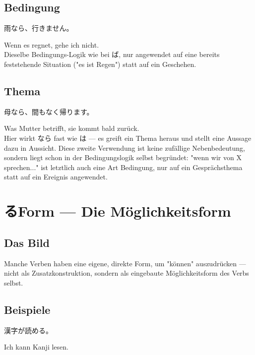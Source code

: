 \documentclass[12pt]{book}
\begin{document}
\section*{Bedingung}

\par\quad 雨なら、行きません。\\
\par\quad Wenn es regnet, gehe ich nicht.\\

Dieselbe Bedingungs-Logik wie bei ば, nur angewendet auf eine bereits feststehende Situation ("es ist Regen") statt auf ein Geschehen.

\section*{Thema}

\par\quad 母なら、間もなく帰ります。\\
\par\quad Was Mutter betrifft, sie kommt bald zurück.\\

Hier wirkt なら fast wie は — es greift ein Thema heraus und stellt eine Aussage dazu in Aussicht. Diese zweite Verwendung ist keine zufällige Nebenbedeutung, sondern liegt schon in der Bedingungslogik selbst begründet: "wenn wir von X sprechen..." ist letztlich auch eine Art Bedingung, nur auf ein Gesprächsthema statt auf ein Ereignis angewendet.


\chapter{るForm — Die Möglichkeitsform}

\section*{Das Bild}

Manche Verben haben eine eigene, direkte Form, um "können" auszudrücken — nicht als Zusatzkonstruktion, sondern als eingebaute Möglichkeitsform des Verbs selbst.

\section*{Beispiele}

\par\quad 漢字が読める。\\
\par\quad Ich kann Kanji lesen.\\
\end{document}
